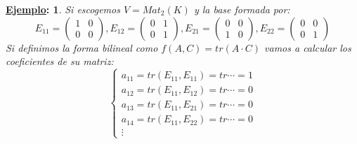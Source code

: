 \documentclass[10pt,a4paper,openright]{book}
\theoremstyle{break}
\newtheorem*{ej}{\underline{Ejemplo}:}
\begin{document}
\begin{ej}
Si escogemos $V=Mat_2(K)$ y la base formada por:
$$E_{11}=\begin{pmatrix} 1 & 0 \\ 0 & 0\end{pmatrix}, E_{12}=\begin{pmatrix} 0 & 1 \\ 0 & 1\end{pmatrix}, E_{21}=\begin{pmatrix} 0 & 0 \\ 1 & 0\end{pmatrix}, E_{22}=\begin{pmatrix} 0 & 0 \\ 0 & 1\end{pmatrix}$$
Si definimos la forma bilineal como $f(A,C)=tr(A\cdot C)$ vamos a  calcular los coeficientes de su matriz:
$$\begin{cases} a_{11} = tr(E_{11},E_{11})=tr\cdots = 1\\
a_{12} = tr(E_{11}, E_{12})= tr \cdots =0 \\ a_{13} = tr(E_{11},E_{21})=tr\cdots = 0 \\ a_{14} = tr(E_{11},E_{22})=tr\cdots = 0 \\ \vdots\end{cases}$$
\end{ej}
\end{document}
